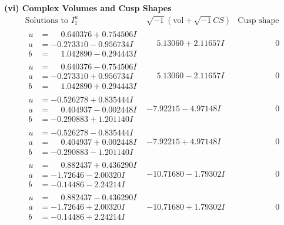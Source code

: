 \documentclass[1p]{elsarticle_modified}
\theoremstyle{definition}
\newcommand{\I}{\sqrt{-1}}
\begin{document}
\newpage\flushleft \textbf{(vi) Complex Volumes and Cusp Shapes}
$$\begin{array}{c|c|c}  
\text{Solutions to }I^u_{1}& \I (\text{vol} + \sqrt{-1}CS) & \text{Cusp shape}\\
 \hline 
\begin{aligned}
u &= \phantom{-}0.640376 + 0.754506 I \\
a &= -0.273310 - 0.956734 I \\
b &= \phantom{-}1.042890 - 0.294443 I\end{aligned}
 & \phantom{-}5.13060 + 2.11657 I & \phantom{-0.000000 } 0 \\ \hline\begin{aligned}
u &= \phantom{-}0.640376 - 0.754506 I \\
a &= -0.273310 + 0.956734 I \\
b &= \phantom{-}1.042890 + 0.294443 I\end{aligned}
 & \phantom{-}5.13060 - 2.11657 I & \phantom{-0.000000 } 0 \\ \hline\begin{aligned}
u &= -0.526278 + 0.835444 I \\
a &= \phantom{-}0.404937 - 0.002448 I \\
b &= -0.290883 + 1.201140 I\end{aligned}
 & -7.92215 - 4.97148 I & \phantom{-0.000000 } 0 \\ \hline\begin{aligned}
u &= -0.526278 - 0.835444 I \\
a &= \phantom{-}0.404937 + 0.002448 I \\
b &= -0.290883 - 1.201140 I\end{aligned}
 & -7.92215 + 4.97148 I & \phantom{-0.000000 } 0 \\ \hline\begin{aligned}
u &= \phantom{-}0.882437 + 0.436290 I \\
a &= -1.72646 - 2.00320 I \\
b &= -0.14486 - 2.24214 I\end{aligned}
 & -10.71680 - 1.79302 I & \phantom{-0.000000 } 0 \\ \hline\begin{aligned}
u &= \phantom{-}0.882437 - 0.436290 I \\
a &= -1.72646 + 2.00320 I \\
b &= -0.14486 + 2.24214 I\end{aligned}
 & -10.71680 + 1.79302 I & \phantom{-0.000000 } 0 \\ \hline\begin{aligned}

\end{aligned}
\end{array}$$
\end{document}
